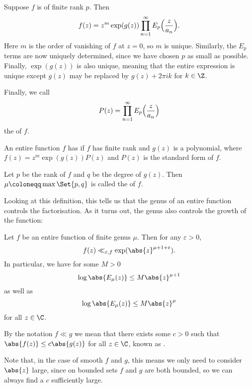 \begin{remark}
	Suppose $f$ is of finite rank $p$.
	Then
	\[
		f(z) = z^m \exp(g(z)) \prod_{n = 1}^\infty E_p\Bigl( \frac{z}{a_n} \Bigr).
	\]
	Here $m$ is the order of vanishing of $f$ at $z = 0$, so $m$ is unique.
	Similarly, the $E_p$ terms are now uniquely determined, since we have chosen $p$ as small as possible.
	Finally, $\exp(g(z))$ is also unique, meaning that the entire expression is unique except $g(z)$ may be replaced by $g(z) + 2 \pi i k$ for $k \in \Z$.

	Finally, we call
	\[
		P(z) = \prod_{n = 1}^\infty E_p\Bigl( \frac{z}{a_n} \Bigr)
	\]
	the  of $f$.
\end{remark}

\begin{definition}[Genus]
	An entire function $f$ has  if $f$ has finite rank and $g(z)$ is a polynomial, where $f(z) = z^m \exp(g(z)) P(z)$ and $P(z)$ is the standard form of $f$.

	Let $p$ be the rank of $f$ and $q$ be the degree of $g(z)$.
	Then $\mu \coloneqq \max\Set{p, q}$ is called the  of $f$.
\end{definition}

Looking at this definition, this tells us that the genus of an entire function controls the factorisation.
As it turns out, the genus also controls the growth of the function:

\begin{theorem}\label{thm8.12}
	Let $f$ be an entire function of finite genus $\mu$.
	Then for any $\varepsilon > 0$,
	\[
		f(z) \ll_{\varepsilon, f} \exp(\abs{z}^{\mu + 1 + \varepsilon}).
	\]
	In particular, we have for some $M > 0$
	\[
		\log \abs{E_\mu(z)} \leq M \abs{z}^{\mu + 1}
	\]
	as well as
	\[
		\log \abs{E_\mu(z)} \leq M \abs{z}^{\mu}
	\]
	for all $z \in \C$.
\end{theorem}

\begin{remark}
	By the notation $f \ll g$ we mean that there exists some $c > 0$ such that $\abs{f(z)} \leq c \abs{g(z)}$ for all $z \in \C$, known as .

	Note that, in the case of smooth $f$ and $g$, this means we only need to consider $\abs{z}$ large, since on bounded sets $f$ and $g$ are both bounded, so we can always find a $c$ sufficiently large.
\end{remark}


